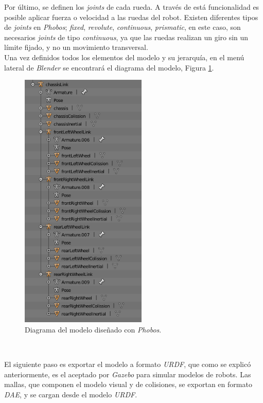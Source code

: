 Por último, se definen los \textit{joints} de cada rueda. A través de está funcionalidad es posible aplicar fuerza o velocidad a las ruedas del robot. Existen diferentes tipos de
\textit{joints} en \textit{Phobos}; \textit{fixed}, \textit{revolute}, \textit{continuous}, \textit{prismatic}, en este caso, son necesarios \textit{joints} de tipo \textit{continuous}, ya que las ruedas realizan un giro sin un límite fijado, y no un movimiento transversal.\\

Una vez definidos todos los elementos del modelo y su jerarquía, en el menú lateral de \textit{Blender} se encontrará el diagrama del modelo, Figura \ref{fig:blenderdiagram}.\\

\begin{figure} [h!]
	\begin{center}
		\includegraphics[width=6cm]{figs/phobosDiagram}
	\end{center}
	\caption{Diagrama del modelo diseñado con \textit{Phobos}.}
	\label{fig:blenderdiagram}
\end{figure}\

El siguiente paso es exportar el modelo a formato \textit{URDF}, que como se explicó anteriormente, es el aceptado por \textit{Gazebo} para simular modelos de robots. Las mallas, que componen el modelo visual y de colisiones, se exportan en formato \textit{DAE}, y se cargan desde el modelo \textit{URDF}.\\

